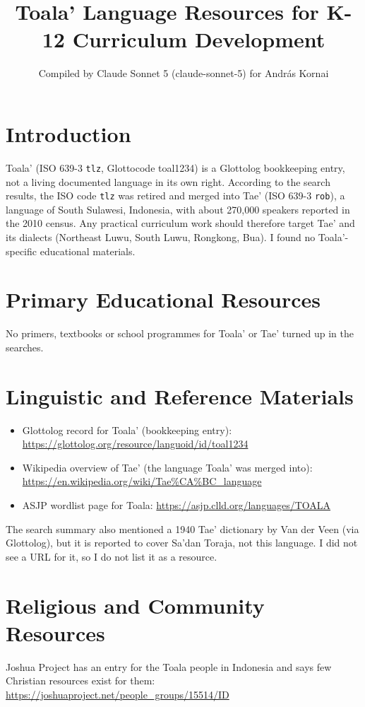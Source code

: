 \documentclass[12pt]{article}
\title{Toala' Language Resources for K-12 Curriculum Development}
\author{Compiled by Claude Sonnet 5 (claude-sonnet-5) for Andr\'as Kornai}
\date{}
\begin{document}
\maketitle

\section{Introduction}
Toala' (ISO 639-3 \texttt{tlz}, Glottocode toal1234) is a Glottolog bookkeeping entry, not a living documented language in its own right. According to the search results, the ISO code \texttt{tlz} was retired and merged into Tae' (ISO 639-3 \texttt{rob}), a language of South Sulawesi, Indonesia, with about 270,000 speakers reported in the 2010 census. Any practical curriculum work should therefore target Tae' and its dialects (Northeast Luwu, South Luwu, Rongkong, Bua). I found no Toala'-specific educational materials.

\section{Primary Educational Resources}
No primers, textbooks or school programmes for Toala' or Tae' turned up in the searches.

\section{Linguistic and Reference Materials}
\begin{itemize}
\item Glottolog record for Toala' (bookkeeping entry): \url{https://glottolog.org/resource/languoid/id/toal1234}
\item Wikipedia overview of Tae' (the language Toala' was merged into): \url{https://en.wikipedia.org/wiki/Tae%CA%BC_language}
\item ASJP wordlist page for Toala: \url{https://asjp.clld.org/languages/TOALA}
\end{itemize}
The search summary also mentioned a 1940 Tae' dictionary by Van der Veen (via Glottolog), but it is reported to cover Sa'dan Toraja, not this language. I did not see a URL for it, so I do not list it as a resource.

\section{Religious and Community Resources}
Joshua Project has an entry for the Toala people in Indonesia and says few Christian resources exist for them: \url{https://joshuaproject.net/people_groups/15514/ID}
\end{document}

